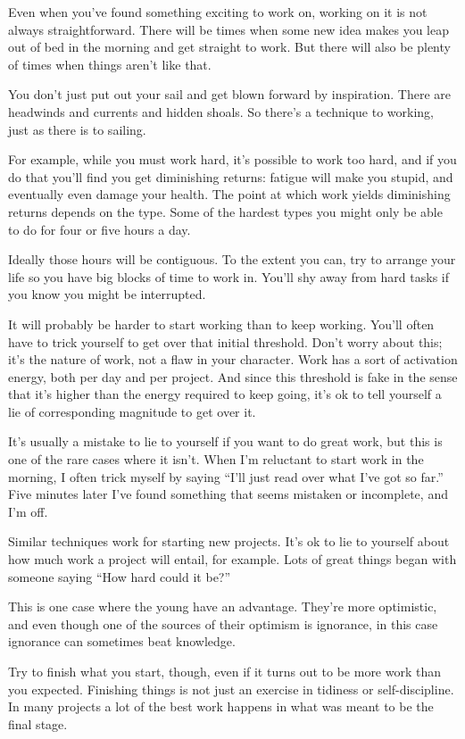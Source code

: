 Even when you've found something exciting to work on, working on it is
not always straightforward. There will be times when some new idea makes
you leap out of bed in the morning and get straight to work. But there
will also be plenty of times when things aren't like that.

You don't just put out your sail and get blown forward by inspiration.
There are headwinds and currents and hidden shoals. So there's a
technique to working, just as there is to sailing.

For example, while you must work hard, it's possible to work too hard,
and if you do that you'll find you get diminishing returns: fatigue will
make you stupid, and eventually even damage your health. The point at
which work yields diminishing returns depends on the type. Some of the
hardest types you might only be able to do for four or five hours a day.

Ideally those hours will be contiguous. To the extent you can, try to
arrange your life so you have big blocks of time to work in. You'll shy
away from hard tasks if you know you might be interrupted.

It will probably be harder to start working than to keep working. You'll
often have to trick yourself to get over that initial threshold. Don't
worry about this; it's the nature of work, not a flaw in your character.
Work has a sort of activation energy, both per day and per project. And
since this threshold is fake in the sense that it's higher than the
energy required to keep going, it's ok to tell yourself a lie of
corresponding magnitude to get over it.

It's usually a mistake to lie to yourself if you want to do great work,
but this is one of the rare cases where it isn't. When I'm reluctant to
start work in the morning, I often trick myself by saying ``I'll just
read over what I've got so far.'' Five minutes later I've found
something that seems mistaken or incomplete, and I'm off.

Similar techniques work for starting new projects. It's ok to lie to
yourself about how much work a project will entail, for example. Lots of
great things began with someone saying ``How hard could it be?''

This is one case where the young have an advantage. They're more
optimistic, and even though one of the sources of their optimism is
ignorance, in this case ignorance can sometimes beat knowledge.

Try to finish what you start, though, even if it turns out to be more
work than you expected. Finishing things is not just an exercise in
tidiness or self-discipline. In many projects a lot of the best work
happens in what was meant to be the final stage.

